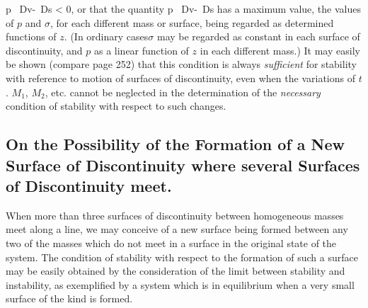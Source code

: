 \documentclass[12pt]{memoir}
\begin{document}
\eqs\Delta \int p \, Dv-\Delta \int \sigma \, Ds < 0,       \label{624} \eqe
or that the quantity
\eqs \int p \, Dv-\int \sigma \, Ds        \label{625} \eqe
has a maximum value, the values of $p$ and $\sigma$, for each different mass or surface, being regarded as determined functions of $z$. (In ordinary cases$\sigma$ may be regarded as constant in each surface of discontinuity, and $p$ as a linear function of $z$ in each different mass.) It may easily be shown (compare page 252) that this condition is always \textit{sufficient} for stability with reference to motion of surfaces of discontinuity, even when the variations of $t$. $M_1$, $M_2$, etc. cannot be neglected in the determination of the \textit{necessary} condition of stability with respect to such changes.
\subsection{On the Possibility of the Formation of a New Surface of Discontinuity where several Surfaces of Discontinuity meet.}
When more than three surfaces of discontinuity between homogeneous masses meet along a line, we may conceive of a new surface being formed between any two of the masses which do not meet in a surface in the original state of the system. The condition of stability with respect to the formation of such a surface may be easily obtained by the consideration of the limit between stability and instability, as exemplified by a system which is in equilibrium when a very small surface of the kind is formed.
\end{document}
